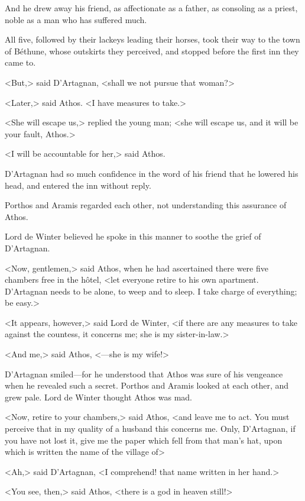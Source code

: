 And he drew away his friend, as affectionate as a father, as consoling as a priest, noble as a man who has suffered much. 

All five, followed by their lackeys leading their horses, took their way to the town of Béthune, whose outskirts they perceived, and stopped before the first inn they came to. 

<But,> said D'Artagnan, <shall we not pursue that woman?> 

<Later,> said Athos. <I have measures to take.> 

<She will escape us,> replied the young man; <she will escape us, and it will be your fault, Athos.> 

<I will be accountable for her,> said Athos. 

D'Artagnan had so much confidence in the word of his friend that he lowered his head, and entered the inn without reply. 

Porthos and Aramis regarded each other, not understanding this assurance of Athos. 

Lord de Winter believed he spoke in this manner to soothe the grief of D'Artagnan. 

<Now, gentlemen,> said Athos, when he had ascertained there were five chambers free in the hôtel, <let everyone retire to his own apartment. D'Artagnan needs to be alone, to weep and to sleep. I take charge of everything; be easy.> 

<It appears, however,> said Lord de Winter, <if there are any measures to take against the countess, it concerns me; she is my sister-in-law.> 

<And me,> said Athos, <—she is my wife!> 

D'Artagnan smiled—for he understood that Athos was sure of his vengeance when he revealed such a secret. Porthos and Aramis looked at each other, and grew pale. Lord de Winter thought Athos was mad. 

<Now, retire to your chambers,> said Athos, <and leave me to act. You must perceive that in my quality of a husband this concerns me. Only, D'Artagnan, if you have not lost it, give me the paper which fell from that man's hat, upon which is written the name of the village of\longdash> 

<Ah,> said D'Artagnan, <I comprehend! that name written in her hand.> 

<You see, then,> said Athos, <there is a god in heaven still!>